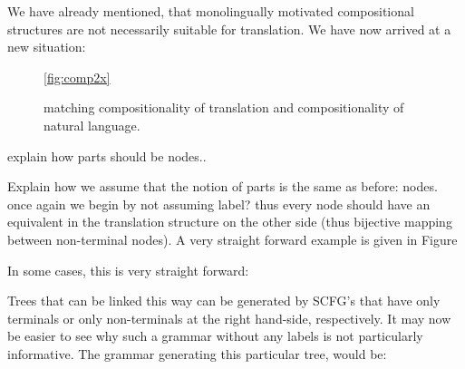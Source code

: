 \documentclass{report}
\theoremstyle{definition}
\theoremstyle{plain}
\begin{document}
We have already mentioned, that monolingually motivated compositional structures are not necessarily suitable for translation. We have now arrived at a new situation:

\begin{figure}
\centering
{}
\caption{matching compositionality of translation and compositionality of natural language.}\ref{fig:comp2x}
\end{figure}
explain how parts should be nodes..

Explain how we assume that the notion of parts is the same as before: nodes. once again we begin by not assuming label?
 thus every node should have an equivalent in the translation structure on the other side (thus bijective mapping between non-terminal nodes). A very straight forward example is given in Figure 

In some cases, this is very straight forward:



Trees that can be linked this way can be generated by SCFG's that have only terminals or only non-terminals at the right hand-side, respectively. It may now be easier to see why such a grammar without any labels is not particularly informative. The grammar generating this particular tree, would be:
\end{document}
